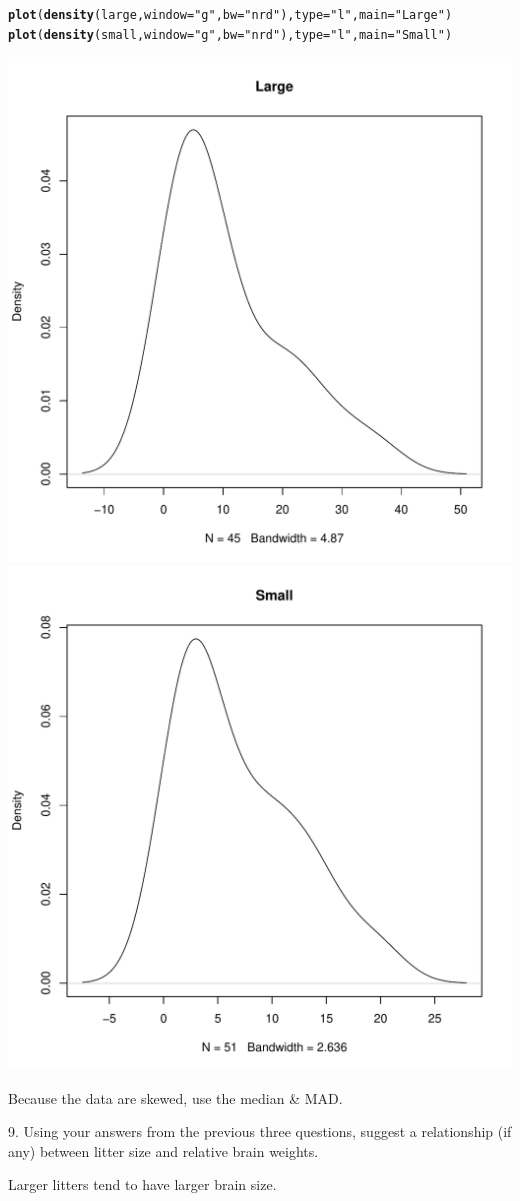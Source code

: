 \documentclass{article}\usepackage{graphicx, color}
\makeatletter
\newcommand{\hlfunctioncall}[1]{\textcolor[rgb]{0.501960784313725,0,0.329411764705882}{\textbf{#1}}}%
\newcommand{\hlstring}[1]{\textcolor[rgb]{0.6,0.6,1}{#1}}%
\newenvironment{kframe}{%
 \def\at@end@of@kframe{}%
 \ifinner\ifhmode%
  \def\at@end@of@kframe{\end{minipage}}%
  \begin{minipage}{\columnwidth}%
 \fi\fi%
 \def\FrameCommand##1{\hskip\@totalleftmargin \hskip-\fboxsep
 \colorbox{shadecolor}{##1}\hskip-\fboxsep
     \hskip-\linewidth \hskip-\@totalleftmargin \hskip\columnwidth}%
 \MakeFramed {\advance\hsize-\width
   \@totalleftmargin\z@ \linewidth\hsize
   \@setminipage}}%
 {\par\unskip\endMakeFramed%
 \at@end@of@kframe}
\newenvironment{knitrout}{}{} %
\makeatother
\begin{document}
\begin{shaded}
\begin{knitrout}
\color{fgcolor}\begin{kframe}
\begin{alltt}
\hlfunctioncall{plot}(\hlfunctioncall{density}(large, window = \hlstring{"g"}, bw = \hlstring{"nrd"}), type = \hlstring{"l"}, main = \hlstring{"Large"})
\hlfunctioncall{plot}(\hlfunctioncall{density}(small, window = \hlstring{"g"}, bw = \hlstring{"nrd"}), type = \hlstring{"l"}, main = \hlstring{"Small"})
\end{alltt}
\end{kframe}

{\centering \includegraphics[width=.45\textwidth]{figure/unnamed-chunk-111} \includegraphics[width=.45\textwidth]{figure/unnamed-chunk-112} 

}


\end{knitrout}

Because the data are skewed, use the median \& MAD. 
\end{shaded}
\item[9.] Using your answers from the previous three questions, suggest a relationship (if any) between litter size and relative brain weights.
\begin{shaded}
Larger litters tend to have larger brain size.
\end{shaded}
\end{document}
